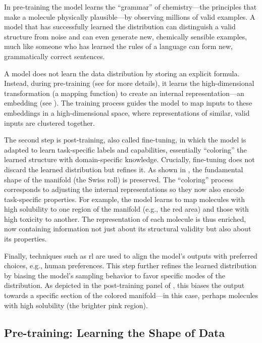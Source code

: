  In pre-training the model learns the \enquote{grammar} of chemistry---the principles that make a molecule physically plausible---by observing millions of valid examples. 
 A model that has successfully learned the distribution can distinguish a valid structure from noise and can even generate new, chemically sensible examples, much like someone who has learned the rules of a language can form new, grammatically correct sentences.  

A model does not learn the data distribution by storing an explicit formula. Instead, during pre-training (see  for more details), it learns the high-dimensional transformation (a mapping function) to create an internal representation---an embedding (see ).
The training process guides the model to map inputs to these embeddings in a high-dimensional space, where representations of similar, valid inputs are clustered together.


The second step is post-training, also called fine-tuning, in which the model is adapted to learn task-specific labels and capabilities, essentially \enquote{coloring} the learned structure with domain-specific knowledge. 
Crucially, fine-tuning does not discard the learned distribution but refines it. 
As shown in , the fundamental shape of the manifold (the Swiss roll) is preserved. 
The \enquote{coloring} process corresponds to adjusting the internal representations so they now also encode task-specific properties. 
For example, the model learns to map molecules with high solubility to one region of the manifold (e.g., the red area) and those with high toxicity to another. 
The representation of each molecule is thus enriched, now containing information not just about its structural validity but also about its properties.

Finally, techniques such as \gls{rl} are used to align the model's outputs with preferred choices, e.g., human preferences. 
This step further refines the learned distribution by biasing the model's sampling behavior to favor specific modes of the distribution. 
As depicted in the post-training panel of , this biases the output towards a specific section of the colored manifold---in this case, perhaps molecules with high solubility (the brighter pink region).



\subsection{Pre-training: Learning the Shape of Data}
\label{sec:pretraining}

